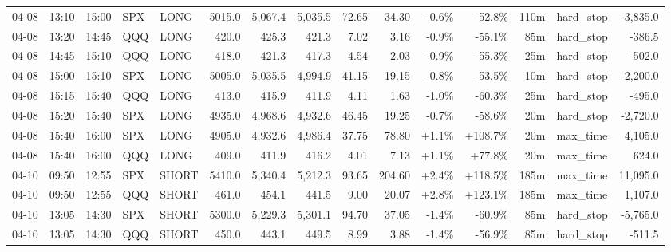 \documentclass[11pt,a4paper,twoside]{article}
\begin{document}
\begin{landscape}
\begin{center}
\begin{longtable}{>{\color{txtmain}}l l l l l r r r r r r r r >{\color{txtmain}}l r}
04-08 & 13:10 & 15:00 & SPX & LONG & 5015.0 & 5,067.4 & 5,035.5 & 72.65 & 34.30 & \textcolor{lossred}{-0.6\%} & \textcolor{lossred}{-52.8\%} & 110m & hard\_stop & \textcolor{lossred}{-3,835.0} \\
04-08 & 13:20 & 14:45 & QQQ & LONG & 420.0 & 425.3 & 421.3 & 7.02 & 3.16 & \textcolor{lossred}{-0.9\%} & \textcolor{lossred}{-55.1\%} & 85m & hard\_stop & \textcolor{lossred}{-386.5} \\
04-08 & 14:45 & 15:10 & QQQ & LONG & 418.0 & 421.3 & 417.3 & 4.54 & 2.03 & \textcolor{lossred}{-0.9\%} & \textcolor{lossred}{-55.3\%} & 25m & hard\_stop & \textcolor{lossred}{-502.0} \\
04-08 & 15:00 & 15:10 & SPX & LONG & 5005.0 & 5,035.5 & 4,994.9 & 41.15 & 19.15 & \textcolor{lossred}{-0.8\%} & \textcolor{lossred}{-53.5\%} & 10m & hard\_stop & \textcolor{lossred}{-2,200.0} \\
04-08 & 15:15 & 15:40 & QQQ & LONG & 413.0 & 415.9 & 411.9 & 4.11 & 1.63 & \textcolor{lossred}{-1.0\%} & \textcolor{lossred}{-60.3\%} & 25m & hard\_stop & \textcolor{lossred}{-495.0} \\
04-08 & 15:20 & 15:40 & SPX & LONG & 4935.0 & 4,968.6 & 4,932.6 & 46.45 & 19.25 & \textcolor{lossred}{-0.7\%} & \textcolor{lossred}{-58.6\%} & 20m & hard\_stop & \textcolor{lossred}{-2,720.0} \\
04-08 & 15:40 & 16:00 & SPX & LONG & 4905.0 & 4,932.6 & 4,986.4 & 37.75 & 78.80 & \textcolor{wingreen}{+1.1\%} & \textcolor{wingreen}{+108.7\%} & 20m & max\_time & \textcolor{wingreen}{4,105.0} \\
04-08 & 15:40 & 16:00 & QQQ & LONG & 409.0 & 411.9 & 416.2 & 4.01 & 7.13 & \textcolor{wingreen}{+1.1\%} & \textcolor{wingreen}{+77.8\%} & 20m & max\_time & \textcolor{wingreen}{624.0} \\
04-10 & 09:50 & 12:55 & SPX & SHORT & 5410.0 & 5,340.4 & 5,212.3 & 93.65 & 204.60 & \textcolor{wingreen}{+2.4\%} & \textcolor{wingreen}{+118.5\%} & 185m & max\_time & \textcolor{wingreen}{11,095.0} \\
04-10 & 09:50 & 12:55 & QQQ & SHORT & 461.0 & 454.1 & 441.5 & 9.00 & 20.07 & \textcolor{wingreen}{+2.8\%} & \textcolor{wingreen}{+123.1\%} & 185m & max\_time & \textcolor{wingreen}{1,107.0} \\
04-10 & 13:05 & 14:30 & SPX & SHORT & 5300.0 & 5,229.3 & 5,301.1 & 94.70 & 37.05 & \textcolor{lossred}{-1.4\%} & \textcolor{lossred}{-60.9\%} & 85m & hard\_stop & \textcolor{lossred}{-5,765.0} \\
04-10 & 13:05 & 14:30 & QQQ & SHORT & 450.0 & 443.1 & 449.5 & 8.99 & 3.88 & \textcolor{lossred}{-1.4\%} & \textcolor{lossred}{-56.9\%} & 85m & hard\_stop & \textcolor{lossred}{-511.5} \\

\end{longtable}
\end{center}
\end{landscape}
\end{document}
